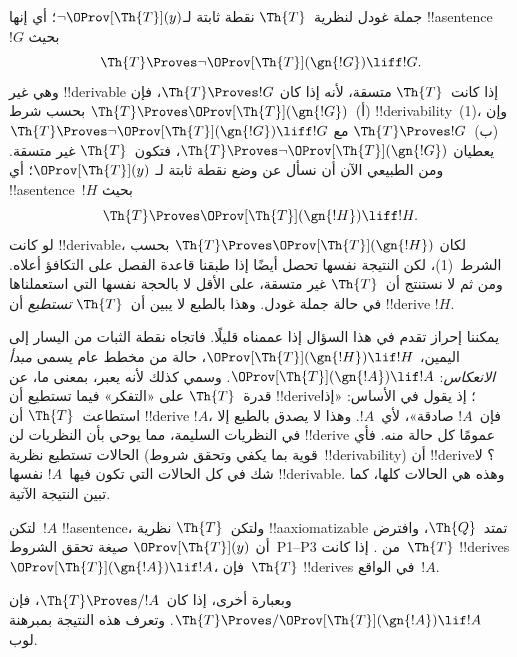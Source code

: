 \documentclass[../../../include/open-logic-section]{subfiles}
\begin{document}


جملة غودل لنظرية~$\Th{T}$ نقطة ثابتة لـ$\lnot
\OProv[\Th{T}](y)$؛ أي إنها !!a{sentence}~$!G$ بحيث
\[
\Th{T} \Proves \lnot \OProv[\Th{T}](\gn{!G}) \liff !G.
\]
وهي غير !!{derivable} إذا كانت~$\Th{T}$ متسقة، لأنه إذا كان
$\Th{T} \Proves !G$، فإن
(أ)~$\Th{T} \Proves \OProv[\Th{T}](\gn{!G})$ بحسب شرط
!!{derivability}~(1)، وإن (ب)~$\Th{T} \Proves !G$ مع
$\Th{T} \Proves \lnot \OProv[\Th{T}](\gn{!G})
\liff !G$ يعطيان
$\Th{T} \Proves \lnot \OProv[\Th{T}](\gn{!G})$، فتكون~$\Th{T}$
غير متسقة. ومن الطبيعي الآن أن نسأل عن وضع نقطة ثابتة لـ
$\OProv[\Th{T}](y)$؛ أي !!a{sentence}~$!H$ بحيث
\[
\Th{T} \Proves \OProv[\Th{T}](\gn{!H}) \liff !H.
\]
لو كانت !!{derivable}، لكان
$\Th{T} \Proves \OProv[\Th{T}](\gn{!H})$ بحسب الشرط~(1)، لكن
النتيجة نفسها تحصل أيضًا إذا طبقنا قاعدة الفصل على التكافؤ أعلاه. ومن
ثم لا نستنتج أن~$\Th{T}$ غير متسقة، على الأقل لا بالحجة نفسها التي
استعملناها في حالة جملة غودل. وهذا بالطبع لا يبين أن~$\Th{T}$
\emph{تستطيع} أن !!{derive} $!H$.

يمكننا إحراز تقدم في هذا السؤال إذا عممناه قليلًا. فاتجاه نقطة الثبات
من اليسار إلى اليمين، $\OProv[\Th{T}](\gn{!H}) \lif !H$، حالة من
مخطط عام يسمى \emph{مبدأ الانعكاس}:
$\OProv[\Th{T}](\gn{!A}) \lif !A$. وسمي كذلك لأنه يعبر، بمعنى ما،
عن قدرة~$\Th{T}$ على «التفكر» فيما تستطيع أن !!{derive}؛ إذ يقول في
الأساس: «إذا استطاعت~$\Th{T}$ أن !!{derive} $!A$، فإن~$!A$ صادقة»،
لأي~$!A$. وهذا لا يصدق بالطبع إلا في النظريات السليمة، مما يوحي بأن
النظريات لن !!{derive} عمومًا كل حالة منه. فأي الحالات تستطيع نظرية
(قوية بما يكفي وتحقق شروط~!!{derivability}) أن !!{derive}؟ لا شك في
كل الحالات التي تكون فيها~$!A$ نفسها !!{derivable}. وهذه هي الحالات
كلها، كما تبين النتيجة الآتية.

\begin{thm}
لتكن~$!A$ !!a{sentence}، ولتكن~$\Th{T}$ نظرية !!a{axiomatizable}
تمتد~$\Th{Q}$، وافترض أن
$\OProv[\Th{T}](y)$ صيغة تحقق الشروط~P1--P3 من
. إذا كانت~$\Th{T}$ !!{derive}s
$\OProv[\Th{T}](\gn{!A}) \lif !A$، فإن~$\Th{T}$ !!{derive}s في
الواقع~$!A$.
\end{thm}

وبعبارة أخرى، إذا كان~$\Th{T} \Proves/ !A$، فإن
$\Th{T} \Proves/ \OProv[\Th{T}](\gn{!A}) \lif !A$. وتعرف هذه
النتيجة بمبرهنة لوب.
\end{document}
